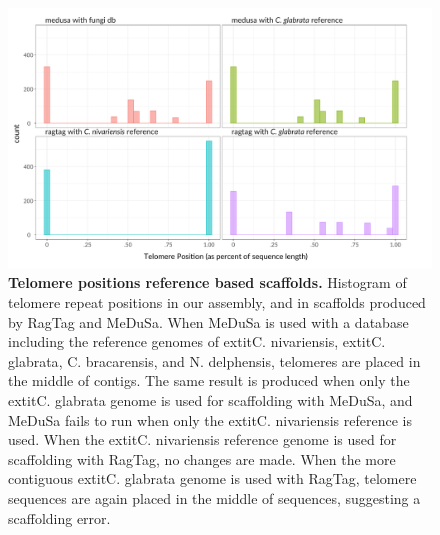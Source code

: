 \begin{figure}[!ht]
\centering
\includegraphics[width = 1\linewidth,keepaspectratio]{figure/telopos.pdf}
\caption[Telomere positions reference based scaffolds]{{\bf Telomere positions reference based scaffolds.} Histogram of telomere repeat positions in our assembly, and in scaffolds produced by RagTag and MeDuSa. When MeDuSa is used with a database including the reference genomes of 	extit{C. nivariensis}, 	extit{C. glabrata}, C. bracarensis, and N. delphensis, telomeres are placed in the middle of contigs. The same result is produced when only the 	extit{C. glabrata} genome is used for scaffolding with MeDuSa, and MeDuSa fails to run when only the 	extit{C. nivariensis} reference is used. When the 	extit{C. nivariensis} reference genome is used for scaffolding with RagTag, no changes are made. When the more contiguous 	extit{C. glabrata} genome is used with RagTag, telomere sequences are again placed in the middle of sequences, suggesting a scaffolding error. }
\label{fig:telopos}
\end{figure}




